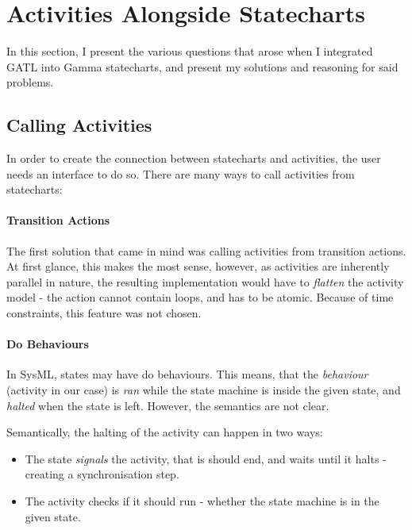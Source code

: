 \section{Activities Alongside Statecharts}\label{sec:activities-alongside-statecharts}

In this section, I present the various questions that arose when I integrated GATL into Gamma statecharts, and present my solutions and reasoning for said problems.

\subsection{Calling Activities}

In order to create the connection between statecharts and activities, the user needs an interface to do so. There are many ways to call activities from statecharts:

\paragraph{Transition Actions}

The first solution that came in mind was calling activities from transition actions. At first glance, this makes the most sense, however, as activities are inherently parallel in nature, the resulting implementation would have to \emph{flatten} the activity model - the action cannot contain loops, and has to be atomic. Because of time constraints, this feature was not chosen. 

\paragraph{Do Behaviours}

In SysML, states may have do behaviours. This means, that the \emph{behaviour} (activity in our case) is \emph{ran} while the state machine is inside the given state, and \emph{halted} when the state is left. However, the semantics are not clear.

Semantically, the halting of the activity can happen in two ways: 

\begin{itemize}
	\item The state \emph{signals} the activity, that is should end, and waits until it halts - creating a synchronisation step.
	\item The activity checks if it should run - whether the state machine is in the given state.
\end{itemize}

